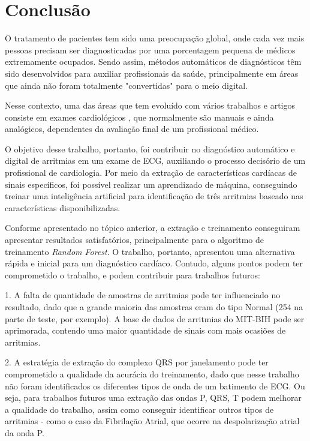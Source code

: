 \documentclass[conference]{IEEEtran}
\begin{document}
\section{Conclusão}

O tratamento de pacientes tem sido uma preocupação global, onde cada vez mais pessoas precisam ser diagnosticadas por uma porcentagem pequena de médicos extremamente ocupados. Sendo assim, métodos automáticos de diagnósticos têm sido desenvolvidos para auxiliar profissionais da saúde, principalmente em áreas que ainda não foram totalmente "convertidas" para o meio digital.

Nesse contexto, uma das áreas que tem evoluído com vários trabalhos e artigos consiste em exames cardiológicos \cite{beckert09}  \cite{barrella14} \cite{manzan06}, que normalmente são manuais e ainda analógicos, dependentes da avaliação final de um profissional médico.

O objetivo desse trabalho, portanto, foi contribuir no diagnóstico automático e digital de arritmias em um exame de ECG, auxiliando o processo decisório de um profissional de cardiologia. Por meio da extração de características cardíacas de sinais específicos, foi possível realizar um aprendizado de máquina, conseguindo treinar uma inteligência artificial para identificação de três arritmias baseado nas características disponibilizadas.

Conforme apresentado no tópico anterior, a extração e treinamento conseguiram apresentar resultados satisfatórios, principalmente para o algoritmo de treinamento \textit{Random Forest}. O trabalho, portanto, apresentou uma alternativa rápida e inicial para um diagnóstico cardíaco. Contudo, alguns pontos podem ter comprometido o trabalho, e podem contribuir para trabalhos futuros:

1. A falta de quantidade de amostras de arritmias pode ter influenciado no resultado, dado que a grande maioria das amostras eram do tipo Normal (254 na parte de teste, por exemplo). A base de dados de arritmias do MIT-BIH pode ser aprimorada, contendo uma maior quantidade de sinais com mais ocasiões de arritmias.

2. A estratégia de extração do complexo QRS por janelamento pode ter comprometido a qualidade da acurácia do treinamento, dado que nesse trabalho não foram identificados os diferentes tipos de onda de um batimento de ECG. Ou seja, para trabalhos futuros uma extração das ondas P, QRS, T podem melhorar a qualidade do trabalho, assim como conseguir identificar outros tipos de arritmias - como o caso da Fibrilação Atrial, que ocorre na despolarização atrial da onda P.
\end{document}
